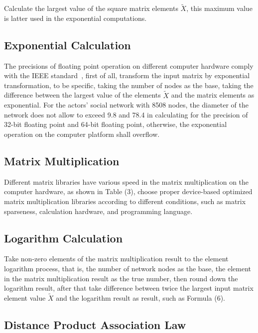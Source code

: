\documentclass[10pt,twocolumn,letterpaper]{article}
\begin{document}
Calculate the largest value of the square matrix elements $\widetilde X$,
this maximum value is latter used in the exponential computations.

\subsection{Exponential Calculation}

The precisions of floating point operation on different computer hardware comply with the IEEE standard~\cite{ieee1985ieee},
first of all, transform the input matrix by exponential transformation, to be specific, taking the number of nodes as the base,
taking the difference between the largest value of the elements $\widetilde X$ and the matrix elements as exponential.
For the actors' social network with 8508 nodes, the diameter of the network does not allow to exceed 9.8 and 78.4
in calculating for the precision of 32-bit floating point and 64-bit floating point,
otherwise, the exponential operation on the computer platform shall overflow.

\subsection{Matrix Multiplication}

Different matrix libraries have various speed in the matrix multiplication on the computer hardware, as shown in Table (3),
choose proper device-based optimized matrix multiplication libraries according to different conditions,
such as matrix sparseness, calculation hardware, and programming language.

\subsection{Logarithm Calculation}
Take non-zero elements of the matrix multiplication result to the element logarithm process, that is, the number of network nodes as the base, the element in the matrix multiplication result as the true number, then round down the logarithm result,
after that take difference between twice the largest input matrix element value $\widetilde X$ and the logarithm result as result, such as Formula (6).

\subsection{Distance Product Association Law}
\end{document}
